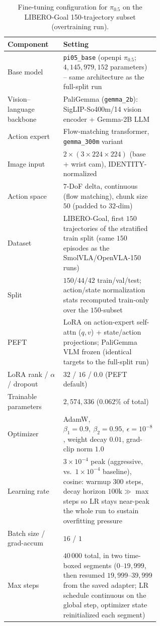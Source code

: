 \documentclass[english,12pt,a4paper,pdftex,elec,utf8]{aaltothesis}
\begin{document}
\begin{table}[t]
  \centering\small
  \caption{Fine-tuning configuration for $\pi_{0.5}$ on the LIBERO-Goal 150-trajectory subset (overtraining run).}
  \label{tab:hparams_pi05_150}
  \begin{tabular}{@{}l p{0.60\linewidth}@{}}
    \toprule
    Component & Setting \\
    \midrule
    Base model                & \texttt{pi05\_base} (openpi $\pi_{0.5}$; $4{,}145{,}979{,}152$ parameters) -- same architecture as the full-split run \\
    Vision--language backbone & PaliGemma (\texttt{gemma\_2b}): SigLIP-So400m/14 vision encoder + Gemma-2B LLM \\
    Action expert              & Flow-matching transformer, \texttt{gemma\_300m} variant \\
    Image input                & $2\times(3\times224\times224)$ (base + wrist cam), IDENTITY-normalized \\
    Action space                & $7$-DoF delta, continuous (flow matching), chunk size $50$ (padded to $32$-dim) \\
    Dataset                    & LIBERO-Goal, first $150$ trajectories of the stratified train split (same $150$ episodes as the SmolVLA/OpenVLA-150 runs) \\
    Split                      & $150/44/42$ train/val/test; action/state normalization stats recomputed train-only over the $150$-subset \\
    \midrule
    PEFT                       & LoRA on action-expert self-attn ($q,v$) + state/action projections; PaliGemma VLM frozen (identical targets to the full-split run) \\
    LoRA rank / $\alpha$ / dropout & $32$ / $16$ / $0.0$ (PEFT default) \\
    Trainable parameters       & $2{,}574{,}336$ ($0.062\%$ of total) \\
    Optimizer                  & AdamW, $\beta_1{=}0.9,\ \beta_2{=}0.95,\ \epsilon{=}10^{-8}$, weight decay $0.01$, grad-clip norm $1.0$ \\
    Learning rate              & $3\times10^{-4}$ peak (aggressive, vs.\ $1\times10^{-4}$ baseline), cosine: warmup $300$ steps, decay horizon $100\text{k} \gg$ max steps so LR stays near-peak the whole run to sustain overfitting pressure \\
    Batch size / grad-accum    & $16$ / $1$ \\
    Max steps                  & $40\,000$ total, in two time-boxed segments ($0$--$19{,}999$, then resumed $19{,}999$--$39{,}999$ from the saved adapter; LR schedule continuous on the global step, optimizer state reinitialized each segment) \\

\end{tabular}
\end{table}
\end{document}
